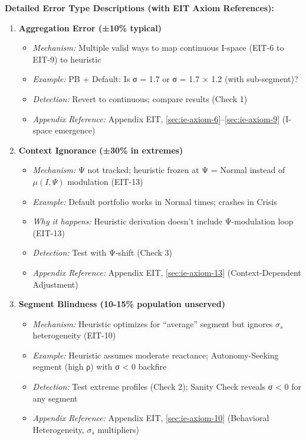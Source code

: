 \textbf{Detailed Error Type Descriptions (with EIT Axiom References):}

\begin{enumerate}
\item \textbf{Aggregation Error (±10\% typical)}
  \begin{itemize}[nosep]
  \item \textit{Mechanism:} Multiple valid ways to map continuous I-space (EIT-6 to EIT-9) to heuristic
  \item \textit{Example:} PB + Default: Is σ = 1.7 or σ = 1.7 × 1.2 (with sub-segment)?
  \item \textit{Detection:} Revert to continuous; compare results (Check 1)
  \item \textit{Appendix Reference:} Appendix EIT, \ref{sec:ie-axiom-6}--\ref{sec:ie-axiom-9} (I-space emergence)
  \end{itemize}

\item \textbf{Context Ignorance (±30\% in extremes)}
  \begin{itemize}[nosep]
  \item \textit{Mechanism:} Ψ not tracked; heuristic frozen at Ψ = Normal instead of $\mu(I, \Psi)$ modulation (EIT-13)
  \item \textit{Example:} Default portfolio works in Normal times; crashes in Crisis
  \item \textit{Why it happens:} Heuristic derivation doesn't include Ψ-modulation loop (EIT-13)
  \item \textit{Detection:} Test with Ψ-shift (Check 3)
  \item \textit{Appendix Reference:} Appendix EIT, \ref{sec:ie-axiom-13} (Context-Dependent Adjustment)
  \end{itemize}

\item \textbf{Segment Blindness (10-15\% population unserved)}
  \begin{itemize}[nosep]
  \item \textit{Mechanism:} Heuristic optimizes for ``average'' segment but ignores $\sigma_s$ heterogeneity (EIT-10)
  \item \textit{Example:} Heuristic assumes moderate reactance; Autonomy-Seeking segment (high ρ) with σ < 0 backfire
  \item \textit{Detection:} Test extreme profiles (Check 2); Sanity Check reveals σ < 0 for any segment
  \item \textit{Appendix Reference:} Appendix EIT, \ref{sec:ie-axiom-10} (Behavioral Heterogeneity, $\sigma_s$ multipliers)
  \end{itemize}


\end{enumerate}
